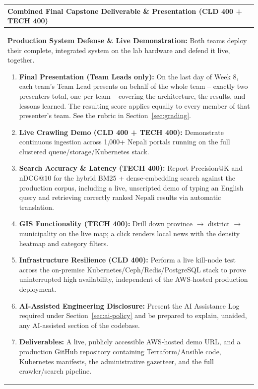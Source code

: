 \documentclass[10pt, a4paper]{article}
\begin{document}
\begin{table}[H]
\centering
\small
\renewcommand{\arraystretch}{1.2}
\begin{tabularx}{\textwidth}{|X|}
\hline
\rowcolor{lightgray}
\textbf{Combined Final Capstone Deliverable \& Presentation (CLD 400 + TECH 400)} \\ \hline
\textbf{Production System Defense \& Live Demonstration:} \newline
Both teams deploy their complete, integrated system on the lab hardware and defend it live, together.
\begin{enumerate}
    \item \textbf{Final Presentation (Team Leads only):} On the last day of Week 8, each team's Team Lead presents on behalf of the whole team -- exactly two presenters total, one per team -- covering the architecture, the results, and lessons learned. The resulting score applies equally to every member of that presenter's team. See the rubric in Section~\ref{sec:grading}.
    \item \textbf{Live Crawling Demo (CLD 400 + TECH 400):} Demonstrate continuous ingestion across 1,000+ Nepali portals running on the full clustered queue/storage/Kubernetes stack.
    \item \textbf{Search Accuracy \& Latency (TECH 400):} Report Precision@K and nDCG@10 for the hybrid BM25 + dense-embedding search against the production corpus, including a live, unscripted demo of typing an English query and retrieving correctly ranked Nepali results via automatic translation.
    \item \textbf{GIS Functionality (TECH 400):} Drill down province $\to$ district $\to$ municipality on the live map; a click renders local news with the density heatmap and category filters.
    \item \textbf{Infrastructure Resilience (CLD 400):} Perform a live kill-node test across the on-premise Kubernetes/Ceph/Redis/PostgreSQL stack to prove uninterrupted high availability, independent of the AWS-hosted production deployment.
    \item \textbf{AI-Assisted Engineering Disclosure:} Present the AI Assistance Log required under Section~\ref{sec:ai-policy} and be prepared to explain, unaided, any AI-assisted section of the codebase.
    \item \textbf{Deliverables:} A live, publicly accessible AWS-hosted demo URL, and a production GitHub repository containing Terraform/Ansible code, Kubernetes manifests, the administrative gazetteer, and the full crawler/search pipeline.
\end{enumerate} \\ \hline
\end{tabularx}
\end{table}
\end{document}

